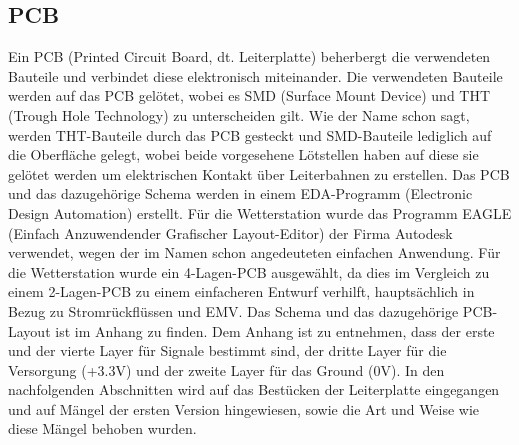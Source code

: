 \subsection{PCB}
\label{subsec:PCB}
Ein PCB (Printed Circuit Board, dt. Leiterplatte) beherbergt die verwendeten Bauteile und verbindet diese elektronisch miteinander. Die verwendeten Bauteile werden auf das PCB gelötet, wobei es SMD (Surface Mount Device) und THT (Trough Hole Technology) zu unterscheiden gilt. Wie der Name schon sagt, werden THT-Bauteile durch das PCB gesteckt und SMD-Bauteile lediglich auf die Oberfläche gelegt, wobei beide vorgesehene Lötstellen haben auf diese sie gelötet werden um elektrischen Kontakt über Leiterbahnen zu erstellen.
Das PCB und das dazugehörige Schema werden in einem EDA-Programm (Electronic Design Automation) erstellt. Für die Wetterstation wurde das Programm EAGLE (Einfach Anzuwendender Grafischer Layout-Editor) der Firma Autodesk verwendet, wegen der im Namen schon angedeuteten einfachen Anwendung. Für die Wetterstation wurde ein 4-Lagen-PCB ausgewählt, da dies im Vergleich zu einem 2-Lagen-PCB zu einem einfacheren Entwurf verhilft, hauptsächlich in Bezug zu Stromrückflüssen und EMV. Das Schema und das dazugehörige PCB-Layout ist im Anhang zu finden. Dem Anhang ist zu entnehmen, dass der erste und der vierte Layer für Signale bestimmt sind, der dritte Layer für die Versorgung (+3.3V) und der zweite Layer für das Ground (0V).  In den nachfolgenden Abschnitten wird auf das Bestücken der Leiterplatte eingegangen und auf Mängel der ersten Version hingewiesen, sowie die Art und Weise wie diese Mängel behoben wurden.
